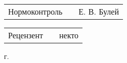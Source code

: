\documentclass[a4paper]{article}
\begin{document}
\begin{FlushLeft}
{  \vspace{14pt}

  \begin{tabular}{p{6.5cm} p{4.767cm} p{5.633cm}}
    \raggedleft Нормоконтроль & & Е. В. Булей \\
  \end{tabular}

  \vspace{14pt}

  \begin{tabular}{p{6.5cm} p{4.767cm} p{5.633cm}}
    \raggedleft Рецензент & & некто \\
  \end{tabular}
  
}\end{FlushLeft}

\begin{Center}{
\cyrillicfontsf 
\englishfontsf
\fontsize{14pt}{21pt} г.
}\end{Center}
\end{document}
